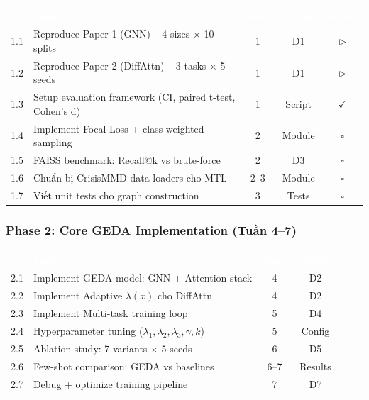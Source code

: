 \documentclass[12pt,a4paper]{article}
\begin{document}
\begin{table}[H]
\centering
{}
\begin{tabularx}{\textwidth}{c X c c c}
\toprule
\rowcolor{phase1!90}
\textcolor{white}{\textbf{\#}} & \textcolor{white}{\textbf{Task}} & \textcolor{white}{\textbf{Tuần}} & \textcolor{white}{\textbf{Output}} & \textcolor{white}{\textbf{Status}} \\
\midrule
1.1 & Reproduce Paper 1 (GNN) -- 4 sizes $\times$ 10 splits & 1 & D1 & \textcolor{inprog}{$\triangleright$} \\
1.2 & Reproduce Paper 2 (DiffAttn) -- 3 tasks $\times$ 5 seeds & 1 & D1 & \textcolor{inprog}{$\triangleright$} \\
1.3 & Setup evaluation framework (CI, paired t-test, Cohen's d) & 1 & Script & \textcolor{done}{$\checkmark$} \\
1.4 & Implement Focal Loss + class-weighted sampling & 2 & Module & \textcolor{todo}{$\square$} \\
1.5 & FAISS benchmark: Recall@k vs brute-force & 2 & D3 & \textcolor{todo}{$\square$} \\
1.6 & Chuẩn bị CrisisMMD data loaders cho MTL & 2--3 & Module & \textcolor{todo}{$\square$} \\
1.7 & Viết unit tests cho graph construction & 3 & Tests & \textcolor{todo}{$\square$} \\
\bottomrule
\end{tabularx}
\end{table}

\subsubsection{Phase 2: Core GEDA Implementation (Tuần 4--7)}

\begin{table}[H]
\centering
{}
\begin{tabularx}{\textwidth}{c X c c}
\toprule
\rowcolor{phase2!90}
\textcolor{white}{\textbf{\#}} & \textcolor{white}{\textbf{Task}} & \textcolor{white}{\textbf{Tuần}} & \textcolor{white}{\textbf{Output}} \\
\midrule
2.1 & Implement GEDA model: GNN + Attention stack & 4 & D2 \\
2.2 & Implement Adaptive $\lambda(x)$ cho DiffAttn & 4 & D2 \\
2.3 & Implement Multi-task training loop & 5 & D4 \\
2.4 & Hyperparameter tuning ($\lambda_1, \lambda_2, \lambda_3, \gamma, k$) & 5 & Config \\
2.5 & Ablation study: 7 variants $\times$ 5 seeds & 6 & D5 \\
2.6 & Few-shot comparison: GEDA vs baselines & 6--7 & Results \\
2.7 & Debug + optimize training pipeline & 7 & D7 \\
\bottomrule
\end{tabularx}
\end{table}
\end{document}
